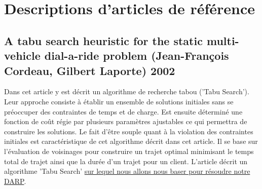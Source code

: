 \documentclass[10pt,a4paper]{report}
\begin{document}

\section*{Descriptions d'articles de référence}
\subsection*{A tabu search heuristic for the static multi-vehicle
dial-a-ride problem (Jean-François Cordeau, Gilbert Laporte) 2002}
Dans cet article y est décrit un algorithme de recherche tabou ('Tabu Search'). Leur approche consiste à établir un ensemble de solutions initiales sans se préoccuper des contraintes de temps et de charge. Est ensuite déterminé une fonction de coût régie par plusieurs paramètres ajustables ce qui permettra de construire les solutions. Le fait d'être souple quant à la violation des contraintes initiales est caractéristique de cet algorithme décrit dans cet article. Il se base sur l'évaluation de voisinages pour construire un trajet optimal minimisant le temps total de trajet ainsi que la durée d'un trajet pour un client. L'article décrit un algorithme 'Tabu Search' \underline{sur lequel nous allons nous baser pour résoudre notre DARP}.
\end{document}

